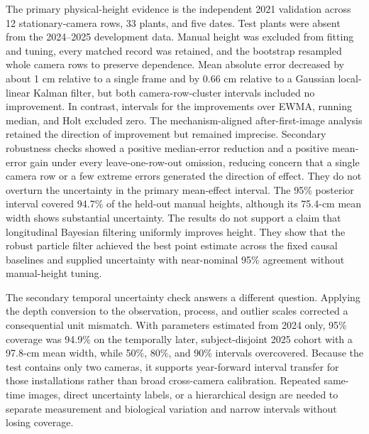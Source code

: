 \documentclass[12pt,letterpaper]{article}
\begin{document}
The primary physical-height evidence is the independent 2021 validation across 12 stationary-camera rows, 33 plants, and five dates. Test plants were absent from the 2024--2025 development data. Manual height was excluded from fitting and tuning, every matched record was retained, and the bootstrap resampled whole camera rows to preserve dependence. Mean absolute error decreased by about 1 cm relative to a single frame and by 0.66 cm relative to a Gaussian local-linear Kalman filter, but both camera-row-cluster intervals included no improvement. In contrast, intervals for the improvements over EWMA, running median, and Holt excluded zero. The mechanism-aligned after-first-image analysis retained the direction of improvement but remained imprecise. Secondary robustness checks showed a positive median-error reduction and a positive mean-error gain under every leave-one-row-out omission, reducing concern that a single camera row or a few extreme errors generated the direction of effect. They do not overturn the uncertainty in the primary mean-effect interval. The 95\% posterior interval covered 94.7\% of the held-out manual heights, although its 75.4-cm mean width shows substantial uncertainty. The results do not support a claim that longitudinal Bayesian filtering uniformly improves height. They show that the robust particle filter achieved the best point estimate across the fixed causal baselines and supplied uncertainty with near-nominal 95\% agreement without manual-height tuning.

The secondary temporal uncertainty check answers a different question. Applying the depth conversion to the observation, process, and outlier scales corrected a consequential unit mismatch. With parameters estimated from 2024 only, 95\% coverage was 94.9\% on the temporally later, subject-disjoint 2025 cohort with a 97.8-cm mean width, while 50\%, 80\%, and 90\% intervals overcovered. Because the test contains only two cameras, it supports year-forward interval transfer for those installations rather than broad cross-camera calibration. Repeated same-time images, direct uncertainty labels, or a hierarchical design are needed to separate measurement and biological variation and narrow intervals without losing coverage.
\end{document}
